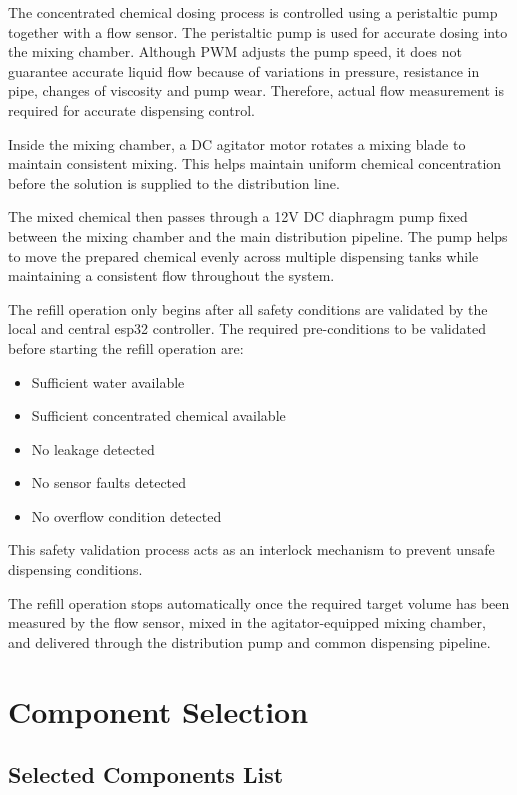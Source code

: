 \documentclass[12pt,a4paper]{report}
\begin{document}
The concentrated chemical dosing process is controlled using a peristaltic pump together with a flow sensor. The peristaltic pump is used for accurate dosing into the mixing chamber. Although PWM adjusts the pump speed, it does not guarantee accurate liquid flow because of variations in pressure, resistance in pipe, changes of viscosity and pump wear.
Therefore, actual flow measurement is required for accurate dispensing control.

Inside the mixing chamber, a DC agitator motor rotates a mixing blade to maintain consistent mixing. This helps maintain uniform chemical concentration before the solution is supplied to the distribution line.

The mixed chemical then passes through a 12V DC diaphragm pump fixed between the mixing chamber and the main distribution pipeline. The pump helps to move the prepared chemical evenly across multiple dispensing tanks while maintaining a consistent flow throughout the system.

The refill operation only begins after all safety conditions are validated by the local and central esp32 controller.
The required pre-conditions to be validated before starting the refill operation are:

\begin{itemize}
    \item Sufficient water available
    \item Sufficient concentrated chemical available
    \item No leakage detected
    \item No sensor faults detected
    \item No overflow condition detected
\end{itemize}

This safety validation process acts as an interlock mechanism to prevent unsafe dispensing conditions.

The refill operation stops automatically once the required target volume has been measured by the flow sensor, mixed in the agitator-equipped mixing chamber, and delivered through the distribution pump and common dispensing pipeline.


\chapter{Component Selection}

\section{Selected Components List}
\end{document}
